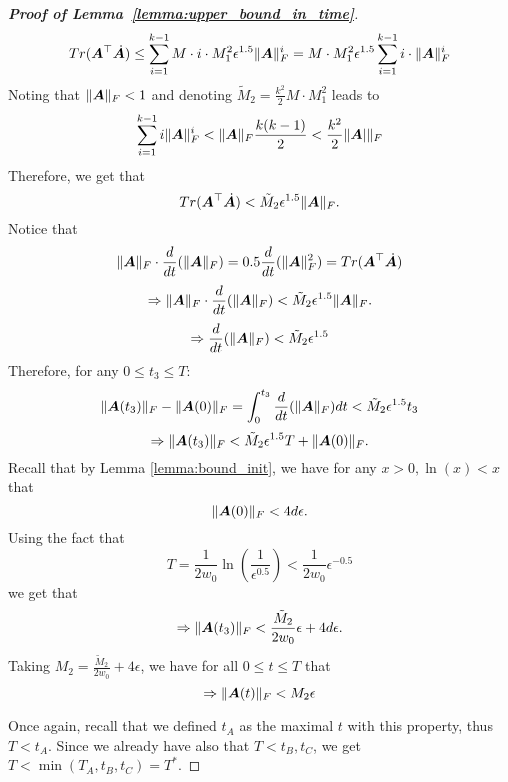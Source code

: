 \begin{proof}[\textbf{Proof of Lemma~\ref{lemma:upper_bound_in_time}}]
\begin{equation}
Tr({\bm{A}}^\top \dot{{\bm{A}}})\le \sum_{i=1}^{k-1} M \cdot i \cdot M_1^2 \epsilon^{1.5} \|{\bm{A}}\|_F^i = M \cdot M_1^2 \epsilon^{1.5} \sum_{i=1}^{k-1}  i \cdot  \|{\bm{A}}\|_F^i
\end{equation}
Noting that $\|{\bm{A}}\|_F <1$ and denoting $\tilde{M}_2 = \frac{k^2}{2} M \cdot M_1^2$ leads to
\begin{equation}
    \sum_{i=1}^{k-1}  i \|{\bm{A}}\|_F^i < \|{\bm{A}}\|_F \frac{k(k-1)}{2} < \frac{k^2}{2} \|{\bm{A}}|\|_F
\end{equation}
Therefore, we get that
\begin{equation}
 Tr({\bm{A}}^\top \dot{{\bm{A}}}) < \tilde{M}_2 \epsilon^{1.5}  \|{\bm{A}}\|_F.
\end{equation}
Notice that
\begin{equation}
    \|{\bm{A}}\|_F \cdot \frac{d}{dt}(\|{\bm{A}}\|_F)  =0.5 \frac{d}{dt}(\|{\bm{A}}\|_F^2) = Tr({\bm{A}}^\top \dot{{\bm{A}}})
\end{equation}
%
\begin{equation}
    \Rightarrow \|{\bm{A}}\|_F \cdot \frac{d}{dt}(\|{\bm{A}}\|_F) < \tilde{M}_2 \epsilon^{1.5}  \|{\bm{A}}\|_F.
\end{equation}
\begin{equation}
    \Rightarrow \frac{d}{dt}(\|{\bm{A}}\|_F) < \tilde{M}_2 \epsilon^{1.5}
\end{equation}
Therefore, for any $0 \leq t_3 \leq T$:
%
\begin{equation}
    \|{\bm{A}}(t_3)\|_F-\|{\bm{A}}(0)\|_F = \int_0^{t_3} \frac{d}{dt}(\|{\bm{A}}\|_F) dt< \tilde{M}_2 \epsilon^{1.5} t_3
\end{equation}
%
\begin{equation}
    \Rightarrow \|{\bm{A}}(t_3)\|_F < \tilde{M}_2 \epsilon^{1.5} T + \|{\bm{A}}(0)\|_F.
\end{equation}
Recall that by Lemma \ref{lemma:bound_init}, we have for any $x>0, \ln(x)<x$ that
\begin{equation}
    \|{\bm{A}}(0)\|_F < 4 d \epsilon.
\end{equation}
Using the fact that
\begin{equation}
    T = \frac{1}{2w_0}\ln{\left( \frac{1}{\epsilon^{0.5}}\right)} <  \frac{1}{2w_0} \epsilon^{-0.5}
\end{equation}
we get that
\begin{equation}
    \Rightarrow \|{\bm{A}}(t_3)\|_F < \frac{\tilde{M}_2}{2w_0} \epsilon + 4d \epsilon.
\end{equation}
Taking $M_2=\frac{\tilde{M}_2}{2w_0}+ 4\epsilon$, we have for all $0 \leq t \leq T$ that
\begin{equation}
    \Rightarrow \|{\bm{A}}(t)\|_F < M_2 \epsilon
\end{equation}

Once again, recall that we defined $t_A$ as the maximal $t$ with this property, thus $T<t_A$. Since we already have also that $T<t_B, t_C$, we get $T<\min(T_A, t_B, t_C) = T^*$. 
\end{proof}

